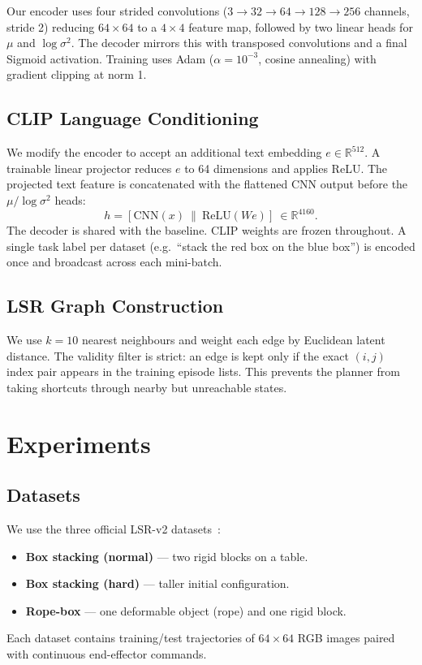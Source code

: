 \documentclass[10pt,twocolumn]{IEEEtran}
\begin{document}
Our encoder uses four strided convolutions ($3 \to 32 \to 64 \to 128 \to
256$ channels, stride 2) reducing $64 \times 64$ to a $4 \times 4$
feature map, followed by two linear heads for $\mu$ and $\log\sigma^2$.
The decoder mirrors this with transposed convolutions and a final Sigmoid
activation.  Training uses Adam ($\alpha = 10^{-3}$, cosine annealing)
with gradient clipping at norm 1.

\subsection{CLIP Language Conditioning}

We modify the encoder to accept an additional text embedding $e \in
\mathbb{R}^{512}$.  A trainable linear projector reduces $e$ to 64
dimensions and applies ReLU.  The projected text feature is concatenated
with the flattened CNN output before the $\mu/\log\sigma^2$ heads:
\begin{equation}
  h = [\text{CNN}(x)\ \|\ \text{ReLU}(We)]\ \in \mathbb{R}^{4160}.
\end{equation}
The decoder is shared with the baseline.  CLIP weights are frozen
throughout.  A single task label per dataset (e.g.\  ``stack the red box
on the blue box'') is encoded once and broadcast across each mini-batch.

\subsection{LSR Graph Construction}

We use $k=10$ nearest neighbours and weight each edge by Euclidean latent
distance.  The validity filter is strict: an edge is kept only if the
exact $(i, j)$ index pair appears in the training episode lists.  This
prevents the planner from taking shortcuts through nearby but unreachable
states.

\section{Experiments}

\subsection{Datasets}

We use the three official LSR-v2 datasets~\cite{lippi2023lsr}:
\begin{itemize}
  \item \textbf{Box stacking (normal)} — two rigid blocks on a table.
  \item \textbf{Box stacking (hard)} — taller initial configuration.
  \item \textbf{Rope-box} — one deformable object (rope) and one rigid block.
\end{itemize}
Each dataset contains training/test trajectories of $64 \times 64$ RGB
images paired with continuous end-effector commands.
\end{document}
